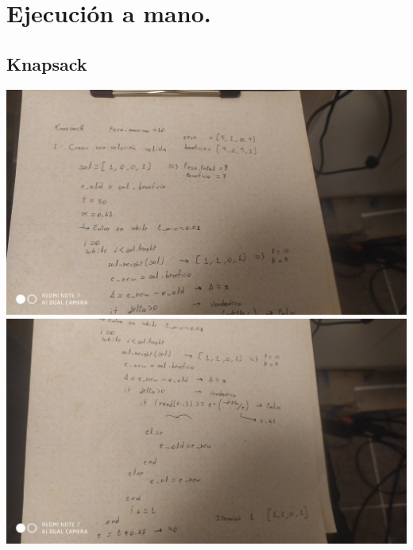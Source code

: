\documentclass[10pt]{article}
\begin{document}
\section{Ejecución a mano.}
\subsection{Knapsack}
\includegraphics[scale=0.135]{imgs/k-1.jpg}\\
\includegraphics[scale=0.135]{imgs/k-2.jpg}
\end{document}
